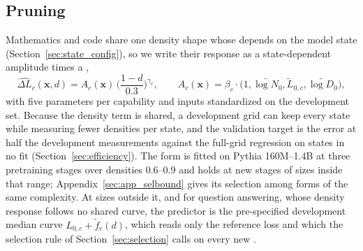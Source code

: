 \subsection{Pruning}
\label{sec:law_prune}

Mathematics and code share one density shape whose  depends on the model state
(Section~\ref{sec:state_config}), so we write their response as a state-dependent amplitude times a
,
\begin{equation}
\widehat{\Delta L}_c(\mathbf x,d)=A_c(\mathbf x)\,\Big(\frac{1-d}{0.3}\Big)^{\gamma_c},
\qquad
A_c(\mathbf x)=\beta_c\cdot\big(1,\tilde{\log N_0},\tilde L_{0,c},\tilde{\log D_0}\big),
\label{eq:power}
\end{equation}
with five parameters per capability and inputs standardized on the development set.  Because the
density term is shared, a development grid can keep every state while measuring fewer densities per
state, and the validation target is the error at half the development measurements against the
full-grid regression on states in no fit (Section~\ref{sec:efficiency}). The form is fitted on Pythia
160M--1.4B at three pretraining stages over densities 0.6--0.9 and holds at new stages of sizes inside
that range; Appendix~\ref{sec:app_selbound} gives its selection among forms of the same complexity. At sizes outside it, and for question answering, whose density response follows no
shared curve, the predictor is the pre-specified development median curve
$L_{0,c}+\widetilde f_c(d)$, which reads only the reference loss and which the selection rule of
Section~\ref{sec:selection} calls on every new .

